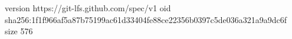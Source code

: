 version https://git-lfs.github.com/spec/v1
oid sha256:1f1f966af5a87b75199ac61d33404fe88ce22356b0397c5de036a321a9a9dc6f
size 576
